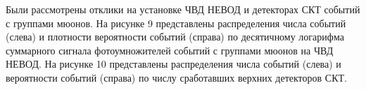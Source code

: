 Были рассмотрены отклики на установке ЧВД НЕВОД и детекторах СКТ событий с группами мюонов. На рисунке 9 представлены распределения числа событий (слева) и плотности вероятности событий (справа) по десятичному логарифма суммарного сигнала фотоумножителей событий с группами мюонов на ЧВД НЕВОД.
На рисунке 10 представлены распределения числа событий (слева) и вероятности событий (справа) по числу сработавших верхних детекторов СКТ.
\endinput
